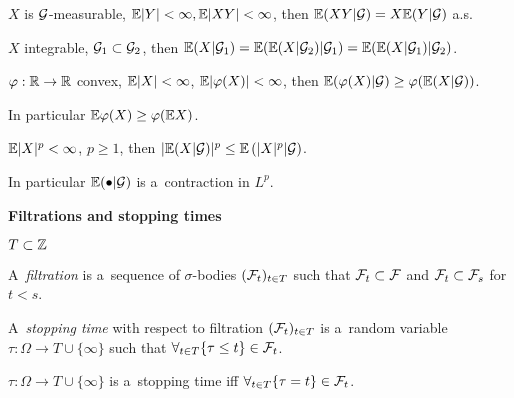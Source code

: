	\begin{proposition}
		$X$ is $\mathcal{G}$-measurable, $\mathbb{E}|Y| < \infty, \mathbb{E}|XY| < \infty$,
		then $\mathbb{E}(XY | \mathcal{G}) = X \mathbb{E}(Y | \mathcal{G})$ a.s.
	\end{proposition}
	
	\begin{proposition}
		$X$ integrable, $\mathcal{G}_1 \subset \mathcal{G}_2$,
		then $\mathbb{E}(X | \mathcal{G}_1) = \mathbb{E}( \mathbb{E}(X | \mathcal{G}_2) | \mathcal{G}_1)
					= \mathbb{E}( \mathbb{E}(X | \mathcal{G}_1) | \mathcal{G}_2)$.
	\end{proposition}
	
	\begin{proposition}
		$\varphi:\mathbb{R} \to \mathbb{R}$ convex, $\mathbb{E} |X| < \infty$,
			$\mathbb{E} |\varphi(X)| < \infty$,
		then $\mathbb{E}(\varphi(X) | \mathcal{G}) \geq \varphi(\mathbb{E}(X | \mathcal{G}))$.
		
		In particular $\mathbb{E} \varphi(X) \geq \varphi(\mathbb{E} X)$.
	\end{proposition}
	
	\begin{corollary}
		$\mathbb{E} |X|^p < \infty$, $p \geq 1$,
		then $|\mathbb{E} ( X | \mathcal{G} )|^p \leq \mathbb{E}\left( |X|^p | \mathcal{G}\right)$.
		
		In particular $\mathbb{E}(\bullet | \mathcal{G})$ is a~contraction in $L^p$.
	\end{corollary}
	\vspace{0.5cm}
	
	{\bf Filtrations and stopping times}
	
		$T \subset {\mathbb{Z}}$
	\begin{definition}[filtration]
		A~\emph{filtration} is a~sequence of $\sigma$-bodies $(\mathcal{F}_t)_{t \in T}$ such that $\mathcal{F}_t \subset \mathcal{F}$ and $\mathcal{F}_t \subset \mathcal{F}_s$ for $t < s$.
	\end{definition}
	
	\begin{definition}
		A~\emph{stopping time} with respect to filtration $(\mathcal{F}_t)_{t \in T}$ is a~random variable $\tau: \Omega \to T \cup \{\infty\}$ such that $\displaystyle \forall_{t\in T} \{ \tau \leq t\} \in \mathcal{F}_t$.
	\end{definition}
	
	\begin{proposition}
		$\tau: \Omega \to T \cup \{\infty\}$ is a~stopping time iff $\forall_{t \in T} \{\tau = t\} \in \mathcal{F}_t$.
	\end{proposition}


 
 
